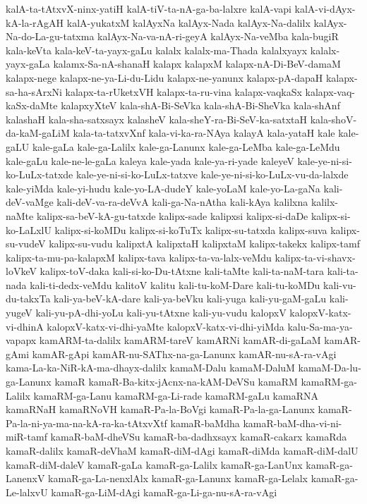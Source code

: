 {kalA-ta-tAtxvX-ninx-yatiH
kalA-tiV-ta-nA-ga-ba-lalxre
kalA-vapi
kalA-vi-dAyx-kA-la-rAgAH
kalA-yukatxM
kalAyxNa
kalAyx-Nada
kalAyx-Na-dalilx
kalAyx-Na-do-La-gu-tatxma
kalAyx-Na-va-nA-ri-geyA
kalAyx-Na-veMba
kala-bugiR
kala-keVta
kala-keV-ta-yayx-gaLu
kalalx
kalalx-ma-Thada
kalalxyayx
kalalx-yayx-gaLa
kalamx-Sa-nA-shanaH
kalapx
kalapxM
kalapx-nA-Di-BeV-damaM
kalapx-nege
kalapx-ne-ya-Li-du-Lidu
kalapx-ne-yanunx
kalapx-pA-dapaH
kalapx-sa-ha-sArxNi
kalapx-ta-rUketxVH
kalapx-ta-ru-vina
kalapx-vaqkaSx
kalapx-vaq-kaSx-daMte
kalapxyXteV
kala-shA-Bi-SeVka
kala-shA-Bi-SheVka
kala-shAnf
kalashaH
kala-sha-satxsayx
kalasheV
kala-sheY-ra-Bi-SeV-ka-satxtaH
kala-shoV-da-kaM-gaLiM
kala-ta-tatxvXnf
kala-vi-ka-ra-NAya
kalayA
kala-yataH
kale
kale-gaLU
kale-gaLa
kale-ga-Lalilx
kale-ga-Lanunx
kale-ga-LeMba
kale-ga-LeMdu
kale-gaLu
kale-ne-le-gaLa
kaleya
kale-yada
kale-ya-ri-yade
kaleyeV
kale-ye-ni-si-ko-LuLx-tatxde
kale-ye-ni-si-ko-LuLx-tatxve
kale-ye-ni-si-ko-LuLx-vu-da-lalxde
kale-yiMda
kale-yi-hudu
kale-yo-LA-dudeY
kale-yoLaM
kale-yo-La-gaNa
kali-deV-vaMge
kali-deV-va-ra-deVvA
kali-ga-Na-nAtha
kali-kAya
kalilxna
kalilx-naMte
kalipx-sa-beV-kA-gu-tatxde
kalipx-sade
kalipxsi
kalipx-si-daDe
kalipx-si-ko-LaLxlU
kalipx-si-koMDu
kalipx-si-koTuTx
kalipx-su-tatxda
kalipx-suva
kalipx-su-vudeV
kalipx-su-vudu
kalipxtA
kalipxtaH
kalipxtaM
kalipx-takekx
kalipx-tamf
kalipx-ta-mu-pa-kalapxM
kalipx-tava
kalipx-ta-va-lalx-veMdu
kalipx-ta-vi-shavx-loVkeV
kalipx-toV-daka
kali-si-ko-Du-tAtxne
kali-taMte
kali-ta-naM-tara
kali-ta-nada
kali-ti-dedx-veMdu
kalitoV
kalitu
kali-tu-koM-Dare
kali-tu-koMDu
kali-vu-du-takxTa
kali-ya-beV-kA-dare
kali-ya-beVku
kali-yuga
kali-yu-gaM-gaLu
kali-yugeV
kali-yu-pA-dhi-yoLu
kali-yu-tAtxne
kali-yu-vudu
kalopxV
kalopxV-katx-vi-dhinA
kalopxV-katx-vi-dhi-yaMte
kalopxV-katx-vi-dhi-yiMda
kalu-Sa-ma-ya-vapapx
kamARM-ta-dalilx
kamARM-tareV
kamARNi
kamAR-di-gaLaM
kamAR-gAmi
kamAR-gApi
kamAR-nu-SAThx-na-ga-Lanunx
kamAR-nu-sA-ra-vAgi
kama-La-ka-NiR-kA-ma-dhayx-dalilx
kamaM-Dalu
kamaM-DaluM
kamaM-Da-lu-ga-Lanunx
kamaR
kamaR-Ba-kitx-jAcnx-na-kAM-DeVSu
kamaRM
kamaRM-ga-Lalilx
kamaRM-ga-Lanu
kamaRM-ga-Li-rade
kamaRM-gaLu
kamaRNA
kamaRNaH
kamaRNoVH
kamaR-Pa-la-BoVgi
kamaR-Pa-la-ga-Lanunx
kamaR-Pa-la-ni-ya-ma-na-kA-ra-ka-tAtxvXtf
kamaR-baMdha
kamaR-baM-dha-vi-ni-miR-tamf
kamaR-baM-dheVSu
kamaR-ba-dadhxsayx
kamaR-cakarx
kamaRda
kamaR-dalilx
kamaR-deVhaM
kamaR-diM-dAgi
kamaR-diMda
kamaR-diM-dalU
kamaR-diM-daleV
kamaR-gaLa
kamaR-ga-Lalilx
kamaR-ga-LanUnx
kamaR-ga-LanenxV
kamaR-ga-La-nenxlAlx
kamaR-ga-Lanunx
kamaR-ga-Lelalx
kamaR-ga-Le-lalxvU
kamaR-ga-LiM-dAgi
kamaR-ga-Li-ga-nu-sA-ra-vAgi
}
